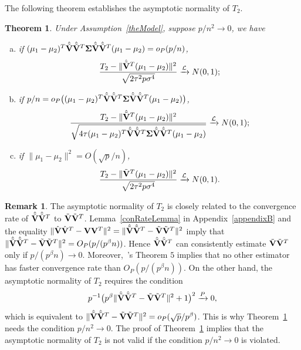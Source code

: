 \documentclass[3p]{elsarticle}
\theoremstyle{plain}
\newtheorem{theorem}{\quad\quad Theorem}
\theoremstyle{definition}
\newtheorem{remark}{\quad\quad Remark}
\theoremstyle{remark}
\begin{document}
The following theorem establishes the asymptotic normality of $T_2$.
\begin{theorem}\label{myPanpan}
    Under Assumption~\ref{theModel},
suppose $p/n^2\to 0$,
    we have
    \begin{enumerate}[(a)]
        \item
 if $(\mu_1-\mu_2)^T \hat{\tilde{\mathbf{V}}}\hat{\tilde{\mathbf{V}}}^T \boldsymbol{\Sigma}\hat{\tilde{\mathbf{V}}}\hat{\tilde{\mathbf{V}}}^T (\mu_1-\mu_2)=o_P(p/n)$,
\begin{equation*}
    \frac{T_2-\|\hat{\tilde{\mathbf{V}}}^T(\mu_1-\mu_2)\|^2}{\sqrt{2\tau^2 p\sigma^4}}\xrightarrow{\mathcal{L}}N(0,1);
\end{equation*}
        \item
 if $p/n=o_P\big((\mu_1-\mu_2)^T \hat{\tilde{\mathbf{V}}}\hat{\tilde{\mathbf{V}}}^T \boldsymbol{\Sigma}\hat{\tilde{\mathbf{V}}}\hat{\tilde{\mathbf{V}}}^T (\mu_1-\mu_2)\big)$,
\begin{equation*}
    \frac{T_2-\|\hat{\tilde{\mathbf{V}}}^T(\mu_1-\mu_2)\|^2}{\sqrt{4\tau (\mu_1-\mu_2)^T \hat{\tilde{\mathbf{V}}}\hat{\tilde{\mathbf{V}}}^T \boldsymbol{\Sigma}\hat{\tilde{\mathbf{V}}}\hat{\tilde{\mathbf{V}}}^T (\mu_1-\mu_2)}}\xrightarrow{\mathcal{L}}N(0,1);
\end{equation*}
        \item
 if $\|\mu_1-\mu_2\|^2=O({\sqrt{p}}/{n})$,
\begin{equation*}
        \frac{T_2-\|\tilde{\mathbf{V}}^T(\mu_1-\mu_2)\|^2}{\sqrt{2\tau^2 p\sigma^4}}\xrightarrow{\mathcal{L}}N(0,1).
\end{equation*}
    \end{enumerate}
\end{theorem} 
\begin{remark}
The asymptotic normality of $T_2$ is closely related to the convergence rate of $\hat{\tilde{\mathbf{V}}}\hat{\tilde{\mathbf{V}}}^T$ to $\tilde{\mathbf{V}}\tilde{\mathbf{V}}^T$.
    Lemma~\ref{conRateLemma} in Appendix~\ref{appendixB} and the equality $\|\hat{\mathbf{V}}\hat{\mathbf{V}}^T -\mathbf{V} \mathbf{V}^T\|^2=\|\hat{\tilde{\mathbf{V}}}\hat{\tilde{\mathbf{V}}}^T -\tilde{\mathbf{V}} \tilde{\mathbf{V}}^T\|^2$ imply that 
    $\|\hat{\tilde{\mathbf{V}}}\hat{\tilde{\mathbf{V}}}^T -\tilde{\mathbf{V}} \tilde{\mathbf{V}}^T\|^2=O_P(p/(p^{\beta}n))$.
    Hence $\hat{\tilde{\mathbf{V}}}\hat{\tilde{\mathbf{V}}}^T$ can consistently estimate $\tilde{\mathbf{V}}\tilde{\mathbf{V}}^T$ only if $p/(p^{\beta}n)\to 0$.
    Moreover,~\cite{Cai2012Sparse}'s Theorem $5$ implies that no other estimator has faster convergence rate than $O_P(p/(p^{\beta}n))$.
    On the other hand, the asymptotic normality of $T_2$ requires the condition
    $$
    p^{-1}\big(p^{\beta}\|\hat{\tilde{\mathbf{V}}}\hat{\tilde{\mathbf{V}}}^T -\tilde{\mathbf{V}} \tilde{\mathbf{V}}^T\|^2+1\big)^2\xrightarrow{P} 0,
    $$
    which is equivalent to $\|\hat{\tilde{\mathbf{V}}}\hat{\tilde{\mathbf{V}}}^T -\tilde{\mathbf{V}} \tilde{\mathbf{V}}^T\|^2=o_P(\sqrt{p}/p^{\beta})$.
    This is why Theorem~\ref{myPanpan} needs the condition  $p/n^2\to 0$.
The proof of Theorem~\ref{myPanpan} implies that the asymptotic normality of $T_2$ is not valid if the condition $p/n^2\to 0$ is violated.
\end{remark}
\end{document}
